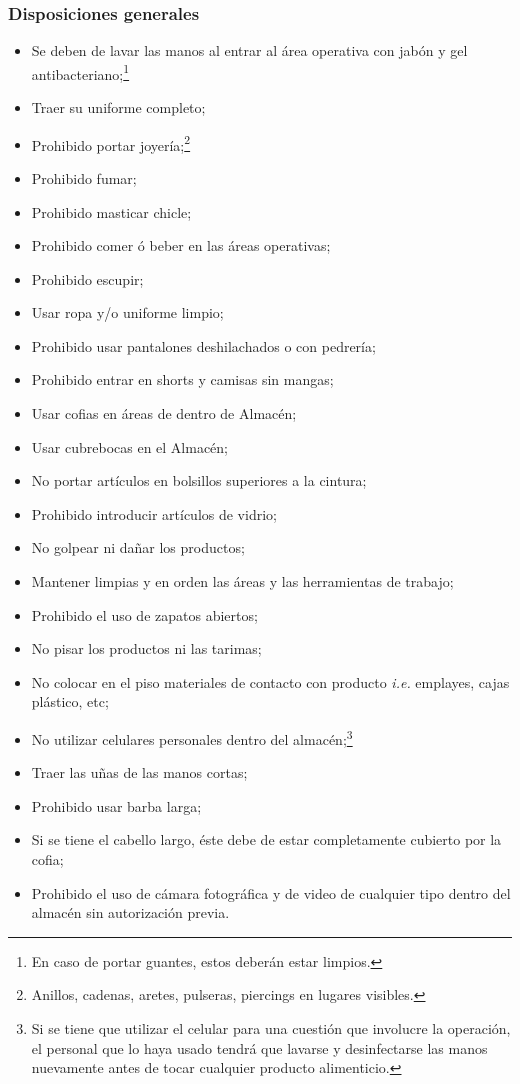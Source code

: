 \subsubsection{Disposiciones generales}
\begin{itemize}
	\item Se deben de lavar las manos al entrar al área operativa con jabón y gel antibacteriano;\footnote{En caso de portar guantes, estos deberán estar limpios.}
	\item Traer su uniforme completo;
	\item Prohibido portar joyería;\footnote{Anillos, cadenas, aretes, pulseras, piercings en lugares visibles.}
	\item Prohibido fumar;
	\item Prohibido masticar chicle;
	\item Prohibido comer ó beber en las áreas operativas;
	\item Prohibido escupir;
	\item Usar ropa y/o uniforme limpio;
	\item Prohibido usar pantalones deshilachados o con pedrería;
	\item Prohibido entrar en shorts y camisas sin mangas;
	\item Usar cofias en áreas de dentro de Almacén;
	\item Usar cubrebocas en el Almacén;
	\item No portar artículos en bolsillos superiores a la cintura;
	\item Prohibido introducir artículos de vidrio;
	\item No golpear ni dañar los productos;
	\item Mantener limpias y en orden las áreas y las herramientas de trabajo;
	\item Prohibido el uso de zapatos abiertos;
	\item No pisar los productos ni las tarimas;
	\item No colocar en el piso materiales de contacto con producto \emph{i.e.} emplayes, cajas plástico, etc;
	\item No utilizar celulares personales dentro del almacén;\footnote{Si se tiene que utilizar el celular para una cuestión que involucre la operación, el personal que lo haya usado tendrá que lavarse y desinfectarse las manos nuevamente antes de tocar cualquier producto alimenticio.}
	\item Traer las uñas de las manos cortas;
	\item Prohibido usar barba larga;
	\item Si se tiene el cabello largo, éste debe de estar completamente cubierto por la cofia;
	\item Prohibido el uso de cámara fotográfica y de video de cualquier tipo dentro del almacén sin autorización previa.
\end{itemize}

